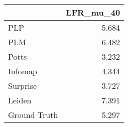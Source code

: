 \begin{tabular}{lr}
\toprule
{} & LFR_mu_40 \\
\midrule
PLP          &     5.684 \\
PLM          &     6.482 \\
Potts        &     3.232 \\
Infomap      &     4.344 \\
Surprise     &     3.727 \\
Leiden       &     7.391 \\
Ground Truth &     5.297 \\
\bottomrule
\end{tabular}
